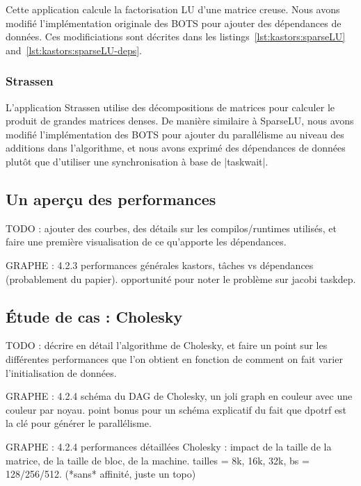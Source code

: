 Cette application calcule la factorisation LU d'une matrice creuse.
Nous avons modifié l'implémentation originale des BOTS pour ajouter des dépendances de données.
Ces modificiations sont décrites dans les listings~\ref{lst:kastors:sparseLU} and~\ref{lst:kastors:sparseLU-deps}.

\subsubsection{Strassen}

L'application Strassen utilise des décompositions de matrices pour calculer le produit de grandes matrices denses.
De manière similaire à SparseLU, nous avons modifié l'implémentation des BOTS pour ajouter du parallélisme au niveau des additions dans l'algorithme, et nous avons exprimé des dépendances de données plutôt que d'utiliser une synchronisation à base de |taskwait|.


\subsection{Un aperçu des performances}

TODO : ajouter des courbes, des détails sur les compilos/runtimes utilisés, et faire une première visualisation de ce qu'apporte les dépendances.

GRAPHE : 4.2.3 performances générales kastors, tâches vs dépendances (probablement du papier). opportunité pour noter le problème sur jacobi taskdep.

\subsection{Étude de cas : Cholesky}
\label{chap:contribs:apps:kastors:cholesky}

TODO : décrire en détail l'algorithme de Cholesky, et faire un point sur les différentes performances que l'on obtient en fonction de comment on fait varier l'initialisation de données.

GRAPHE : 4.2.4 schéma du DAG de Cholesky, un joli graph en couleur avec une couleur par noyau. point bonus pour un schéma explicatif du fait que dpotrf est la clé pour générer le parallélisme.

GRAPHE : 4.2.4 performances détaillées Cholesky : impact de la taille de la matrice, de la taille de bloc, de la machine. tailles = 8k, 16k, 32k, bs = 128/256/512. (*sans* affinité, juste un topo)

